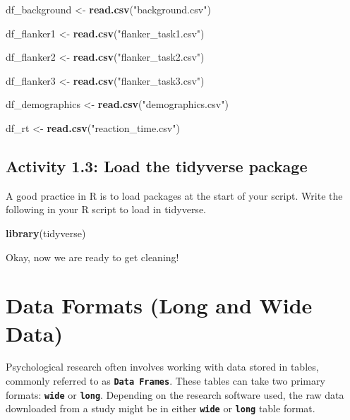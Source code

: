 \documentclass[
]{book}
\newenvironment{Shaded}{\begin{snugshade}}{\end{snugshade}}
\newcommand{\FunctionTok}[1]{\textcolor[rgb]{0.13,0.29,0.53}{\textbf{#1}}}
\newcommand{\NormalTok}[1]{#1}
\newcommand{\OtherTok}[1]{\textcolor[rgb]{0.56,0.35,0.01}{#1}}
\newcommand{\StringTok}[1]{\textcolor[rgb]{0.31,0.60,0.02}{#1}}
\begin{document}
\begin{Shaded}
\begin{Highlighting}[]
\NormalTok{df\_background }\OtherTok{\textless{}{-}} \FunctionTok{read.csv}\NormalTok{(}\StringTok{"background.csv"}\NormalTok{) }

\NormalTok{df\_flanker1 }\OtherTok{\textless{}{-}} \FunctionTok{read.csv}\NormalTok{(}\StringTok{"flanker\_task1.csv"}\NormalTok{)}

\NormalTok{df\_flanker2 }\OtherTok{\textless{}{-}} \FunctionTok{read.csv}\NormalTok{(}\StringTok{"flanker\_task2.csv"}\NormalTok{)}

\NormalTok{df\_flanker3 }\OtherTok{\textless{}{-}} \FunctionTok{read.csv}\NormalTok{(}\StringTok{"flanker\_task3.csv"}\NormalTok{)}

\NormalTok{df\_demographics }\OtherTok{\textless{}{-}} \FunctionTok{read.csv}\NormalTok{(}\StringTok{"demographics.csv"}\NormalTok{)}

\NormalTok{df\_rt }\OtherTok{\textless{}{-}} \FunctionTok{read.csv}\NormalTok{(}\StringTok{"reaction\_time.csv"}\NormalTok{)}
\end{Highlighting}
\end{Shaded}

\subsection{Activity 1.3: Load the tidyverse package}\label{activity-1.3-load-the-tidyverse-package}

A good practice in R is to load packages at the start of your script. Write the following in your R script to load in tidyverse.

\begin{Shaded}
\begin{Highlighting}[]
\FunctionTok{library}\NormalTok{(tidyverse)}
\end{Highlighting}
\end{Shaded}

Okay, now we are ready to get cleaning!

\section{Data Formats (Long and Wide Data)}\label{dataformats}

Psychological research often involves working with data stored in tables, commonly referred to as \textbf{\texttt{Data\ Frames}}. These tables can take two primary formats: \textbf{\texttt{wide}} or \textbf{\texttt{long}}. Depending on the research software used, the raw data downloaded from a study might be in either \textbf{\texttt{wide}} or \textbf{\texttt{long}} table format.
\end{document}
